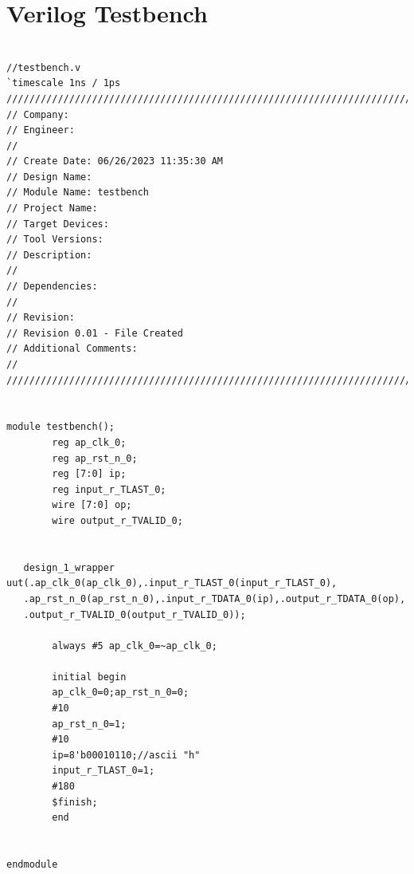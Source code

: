 \documentclass{article}
\begin{document}
\section{Verilog Testbench}
\begin{lstlisting}

//testbench.v
`timescale 1ns / 1ps
//////////////////////////////////////////////////////////////////////////////////
// Company: 
// Engineer: 
// 
// Create Date: 06/26/2023 11:35:30 AM
// Design Name: 
// Module Name: testbench
// Project Name: 
// Target Devices: 
// Tool Versions: 
// Description: 
// 
// Dependencies: 
// 
// Revision:
// Revision 0.01 - File Created
// Additional Comments:
// 
//////////////////////////////////////////////////////////////////////////////////


module testbench();
        reg ap_clk_0;
        reg ap_rst_n_0;         
        reg [7:0] ip;
        reg input_r_TLAST_0;  
        wire [7:0] op;
        wire output_r_TVALID_0;
        
        
   design_1_wrapper uut(.ap_clk_0(ap_clk_0),.input_r_TLAST_0(input_r_TLAST_0),
   .ap_rst_n_0(ap_rst_n_0),.input_r_TDATA_0(ip),.output_r_TDATA_0(op),
   .output_r_TVALID_0(output_r_TVALID_0));
    
        always #5 ap_clk_0=~ap_clk_0;
        
        initial begin
        ap_clk_0=0;ap_rst_n_0=0;
        #10
        ap_rst_n_0=1;
        #10
        ip=8'b00010110;//ascii "h"
        input_r_TLAST_0=1;
        #180
        $finish;
        end
      
    
endmodule

\end{lstlisting}

\vspace{13cm}
\end{document}
